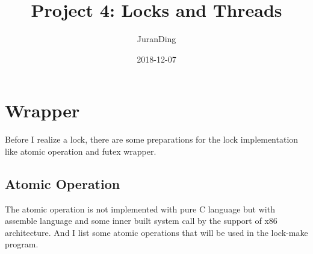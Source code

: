 \documentclass{article}
\title{Project 4: Locks and Threads}
\author{JuranDing}
\date{2018-12-07}
\begin{document}
	\tableofcontents
	\maketitle
	\section{Wrapper}
	Before I realize a lock, there are some preparations for the lock implementation like atomic operation and futex wrapper.
	\subsection{Atomic Operation}
	The atomic operation is not implemented with pure C language but with assemble language and some inner built system call by the support of x86 architecture. And I list some atomic operations that will be used in the lock-make program. \\
\end{document}
